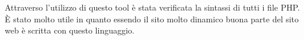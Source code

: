 Attraverso l’utilizzo di questo tool è stata verificata la sintassi di tutti i file PHP. È stato molto utile in quanto essendo il sito molto
dinamico buona parte del sito web è scritta con questo linguaggio.